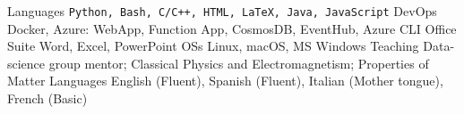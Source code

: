 

\begin{cvskills}
  \cvskill
    {Languages}
    {\texttt{Python, Bash, C/C++, HTML, LaTeX, Java, JavaScript}}
  \cvskill
    {DevOps}
    {Docker, Azure: WebApp, Function App, CosmosDB, EventHub, Azure CLI}
  \cvskill
    {Office Suite}
    {Word, Excel, PowerPoint}
  \cvskill
    {OSs}
    {Linux, macOS, MS Windows}
  \cvskill
    {Teaching}
    {Data-science group mentor; Classical Physics and Electromagnetism; Properties of Matter}
  \cvskill
    {Languages}
    {English (Fluent), Spanish (Fluent), Italian (Mother tongue), French (Basic)}
\end{cvskills}
